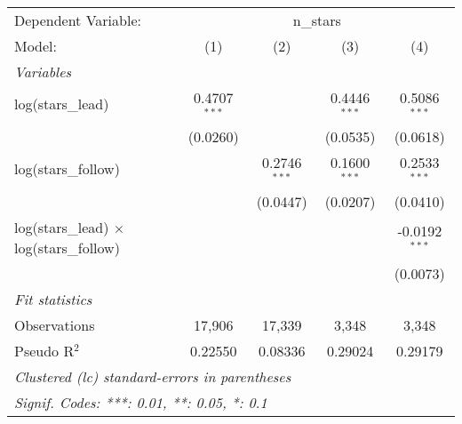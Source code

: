 
\begingroup
\centering
\begin{tabular}{lcccc}
   \tabularnewline \midrule \midrule
   Dependent Variable: & \multicolumn{4}{c}{n\_stars}\\
   Model:                                          & (1)            & (2)            & (3)            & (4)\\  
   \midrule
   \emph{Variables}\\
   log(stars\_lead)                                & 0.4707$^{***}$ &                & 0.4446$^{***}$ & 0.5086$^{***}$\\   
                                                   & (0.0260)       &                & (0.0535)       & (0.0618)\\   
   log(stars\_follow)                              &                & 0.2746$^{***}$ & 0.1600$^{***}$ & 0.2533$^{***}$\\   
                                                   &                & (0.0447)       & (0.0207)       & (0.0410)\\   
   log(stars\_lead) $\times$ log(stars\_follow)    &                &                &                & -0.0192$^{***}$\\   
                                                   &                &                &                & (0.0073)\\   
   \midrule
   \emph{Fit statistics}\\
   Observations                                    & 17,906         & 17,339         & 3,348          & 3,348\\  
   Pseudo R$^2$                                    & 0.22550        & 0.08336        & 0.29024        & 0.29179\\  
   \midrule \midrule
   \multicolumn{5}{l}{\emph{Clustered (lc) standard-errors in parentheses}}\\
   \multicolumn{5}{l}{\emph{Signif. Codes: ***: 0.01, **: 0.05, *: 0.1}}\\
\end{tabular}
\par\endgroup


